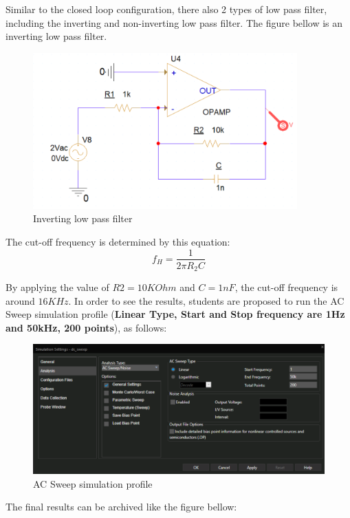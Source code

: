 Similar to the closed loop configuration, there also 2 types of low pass filter, including the inverting and non-inverting low pass filter. The figure bellow is an inverting low pass filter.

\begin{figure}[!htp]
    \centering
    \includegraphics[width = 4in]{source/picture/bai_5/low_filter2.PNG}
    \caption{Inverting low pass filter}
    \label{lab05_low_filter2}
\end{figure}

The cut-off frequency is determined by this equation:
\begin{equation*}
    f_H = \frac{1}{2\pi R_2 C}
\end{equation*}

By applying the value of $R2 = 10KOhm$ and $C=1nF$, the cut-off frequency is around $16KHz$. In order to see the results, students are proposed to run the AC Sweep simulation profile (\textbf{Linear Type, Start and Stop frequency are 1Hz and 50kHz, 200 points}), as follows:

\begin{figure}[!htp]
    \centering
    \includegraphics[width = 5in]{source/picture/bai_5/low_filter3.PNG}
    \caption{AC Sweep simulation profile}
    \label{lab05_low_filter3}
\end{figure}

The final results can be archived like the figure bellow:

